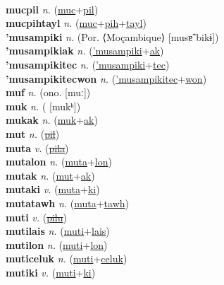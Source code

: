  \label{mucpatolon} \\
\textbf{mucpil} \textit{n.} (\hyperref[muc]{muc}+\hyperref[pil]{pil})
 \label{mucpil} \\
\textbf{mucpihtayl} \textit{n.} (\hyperref[muc]{muc}+\hyperref[pih]{pih}+\hyperref[tayl]{tayl})
 \label{mucpihtayl} \\
\textbf{'musampiki} \textit{n.} (Por. ⟨Moçambique⟩ [musɐ̃ˈbikɨ])
 \label{'musampiki} \\
\textbf{'musampikiak} \textit{n.} (\hyperref['musampiki]{'musampiki}+\hyperref[ak]{ak})
 \label{'musampikiak} \\
\textbf{'musampikitec} \textit{n.} (\hyperref['musampiki]{'musampiki}+\hyperref[tec]{tec})
 \label{'musampikitec} \\
\textbf{'musampikitecwon} \textit{n.} (\hyperref['musampikitec]{'musampikitec}+\hyperref[won]{won})
 \label{'musampikitecwon} \\
\textbf{muf} \textit{n.} (ono. [muː])
 \label{muf} \\
\textbf{muk} \textit{n.} ( [mukʰ])
 \label{muk} \\
\textbf{mukak} \textit{n.} (\hyperref[muk]{muk}+\hyperref[ak]{ak})
 \label{mukak} \\
\textbf{mut} \textit{n.} (\hyperref[pil]{\sout{pil}})
 \label{mut} \\
\textbf{muta} \textit{v.} (\hyperref[pila]{\sout{pila}})
 \label{muta} \\
\textbf{mutalon} \textit{n.} (\hyperref[muta]{muta}+\hyperref[lon]{lon})
 \label{mutalon} \\
\textbf{mutak} \textit{n.} (\hyperref[mut]{mut}+\hyperref[ak]{ak})
 \label{mutak} \\
\textbf{mutaki} \textit{v.} (\hyperref[muta]{muta}+\hyperref[ki]{ki})
 \label{mutaki} \\
\textbf{mutatawh} \textit{n.} (\hyperref[muta]{muta}+\hyperref[tawh]{tawh})
 \label{mutatawh} \\
\textbf{muti} \textit{v.} (\hyperref[pilu]{\sout{pilu}})
 \label{muti} \\
\textbf{mutilais} \textit{n.} (\hyperref[muti]{muti}+\hyperref[lais]{lais})
 \label{mutilais} \\
\textbf{mutilon} \textit{n.} (\hyperref[muti]{muti}+\hyperref[lon]{lon})
 \label{mutilon} \\
\textbf{muticeluk} \textit{n.} (\hyperref[muti]{muti}+\hyperref[celuk]{celuk})
 \label{muticeluk} \\
\textbf{mutiki} \textit{v.} (\hyperref[muti]{muti}+\hyperref[ki]{ki})
